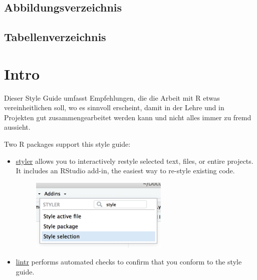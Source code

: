 \documentclass[twoside, pagesize, fontsize=11pt, dvipsnames]{scrreport} %
\begin{document}

\section*{Abbildungsverzeichnis}
\label{sec:Abbildungsverzeichnis}

\listoffigures

\section*{Tabellenverzeichnis}
\label{sec:tabellenverzeichnis}

\listoftables

\cleardoublepage





\hypertarget{intro}{%
\chapter*{Intro}\label{intro}}


Dieser Style Guide umfasst Empfehlungen, die die Arbeit mit R etwas
vereinheitlichen soll, wo es sinnvoll erscheint, damit in der Lehre und
in Projekten gut zusammengearbeitet werden kann und nicht alles immer zu
fremd aussieht.

Two R packages support this style guide:

\begin{itemize}
\item
  \href{http://styler.r-lib.org}{styler} allows you to interactively
  restyle selected text, files, or entire projects. It includes an
  RStudio add-in, the easiest way to re-style existing code.

  \begin{figure}

  {\centering \includegraphics[width=2.6in,height=\textheight]{styler-addin.png}

  }

  \end{figure}
\item
  \href{https://github.com/jimhester/lintr}{lintr} performs automated
  checks to confirm that you conform to the style guide.
\end{itemize}
\end{document}
